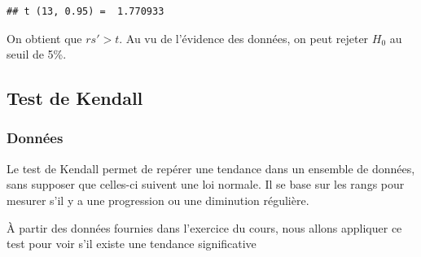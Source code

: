 \documentclass[
  12pt,
]{article}
\begin{document}
\begin{verbatim}
## t (13, 0.95) =  1.770933
\end{verbatim}

On obtient que \(rs' > t\). Au vu de l'évidence des données, on peut
rejeter \(H_0\) au seuil de 5\%.

\subsection{Test de Kendall}\label{test-de-kendall}

\subsubsection{Données}\label{donnuxe9es}

Le test de Kendall permet de repérer une tendance dans un ensemble de
données, sans supposer que celles-ci suivent une loi normale. Il se base
sur les rangs pour mesurer s'il y a une progression ou une diminution
régulière.

À partir des données fournies dans l'exercice du cours, nous allons
appliquer ce test pour voir s'il existe une tendance significative
\end{document}

